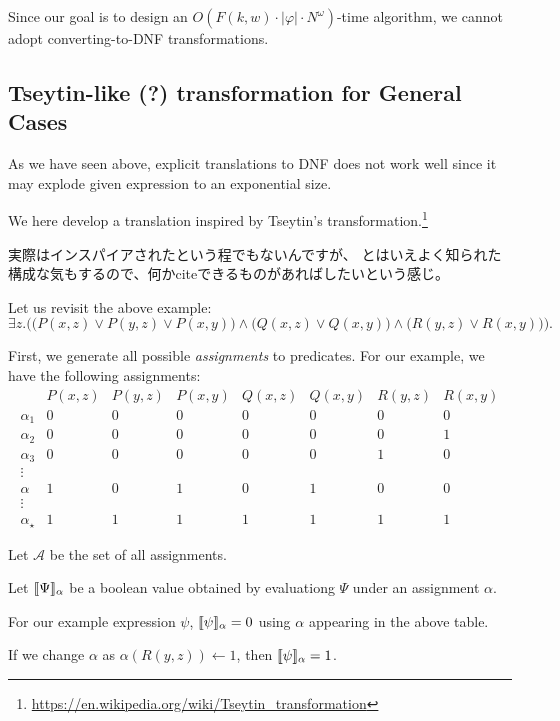 \documentclass[a4paper,UKenglish,cleveref, autoref, thm-restate]{lipics-v2021}
\newenvironment{Jcomment}%
{\begin{screen}\begin{CJK}{UTF8}{ipxm}}%
{\end{CJK}\end{screen}}
\begin{document}
Since our goal is to design an $O(F(k, w) \cdot |\varphi| \cdot N^{\omega})$-time algorithm, we cannot adopt converting-to-DNF transformations.


\subsection{Tseytin-like (?) transformation for General Cases}

As we have seen above, explicit translations to DNF does not work well since it may explode given expression to an exponential size.

We here develop a translation inspired by Tseytin's transformation.\footnote{\url{https://en.wikipedia.org/wiki/Tseytin_transformation}}

\begin{Jcomment}
    実際はインスパイアされたという程でもないんですが、
    とはいえよく知られた構成な気もするので、何かciteできるものがあればしたいという感じ。
\end{Jcomment}

Let us revisit the above example:
$$
\exists z. \biggl(
\bigl(P(x, z) \lor P(y, z) \lor P(x, y) \bigr)
\land
\bigl(Q(x, z) \lor Q(x, y)\bigr)
\land
\bigl(R(y, z) \lor R(x, y)\bigr)
\biggr).
$$

First, we generate all possible \emph{assignments} to predicates.
For our example, we have the following assignments:
$$
\begin{array}{c|ccccccc}
& P(x, z) & P(y, z) & P(x, y) & Q(x, z) & Q(x, y) & R(y, z) & R(x, y) \\\hline
\alpha_1 & 0 & 0 & 0 & 0 & 0 & 0 & 0 \\
\alpha_2 & 0 & 0 & 0 & 0 & 0 & 0 & 1 \\
\alpha_3 & 0 & 0 & 0 & 0 & 0 & 1 & 0 \\
\vdots \\
\alpha   & 1 & 0 & 1 & 0 & 1 & 0 & 0 \\
\vdots \\
\alpha_{\star}   & 1 & 1 & 1 & 1 & 1 & 1 & 1
\end{array}
$$

Let $\mathcal{A}$ be the set of all assignments.

Let $\llbracket\Psi\rrbracket_{\alpha}$ be a boolean value obtained by evaluationg $\Psi$ under an assignment $\alpha$.

For our example expression $\psi$, $\llbracket\psi\rrbracket_{\alpha} = 0$ using $\alpha$ appearing in the above table.

If we change $\alpha$ as $\alpha(R(y,z)) \gets 1$, then $\llbracket\psi\rrbracket_{\alpha} = 1$.
\end{document}
